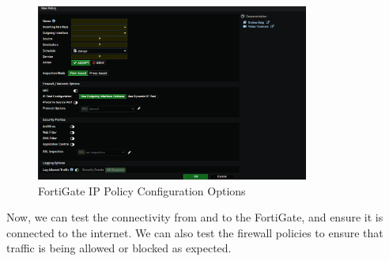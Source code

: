 \documentclass[12pt]{report}
\begin{document}
\begin{figure}
    \centering
    \includegraphics[width=0.8\textwidth]{images/Implementation/ippolicyoptions.png}
    \caption{FortiGate IP Policy Configuration Options}
    \label{fig:ippolicyoptions}
\end{figure}
Now, we can test the connectivity from and to the FortiGate, and ensure it is connected to the internet. We can also test the firewall policies to ensure that traffic is being allowed or blocked as expected.
\end{document}
